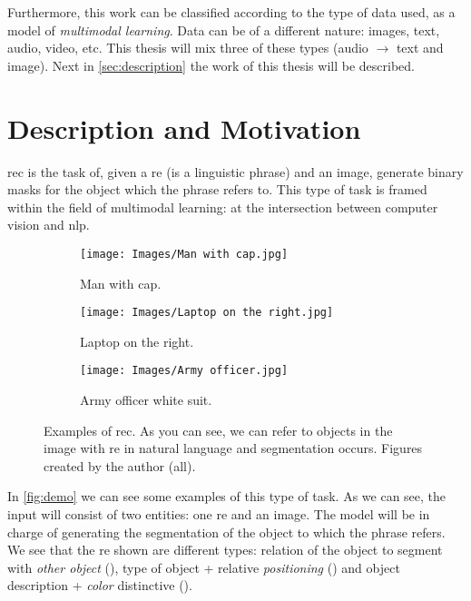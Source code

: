 Furthermore, this work can be classified according to the type of data used, as
a model of \emph{multimodal learning}. Data can be
of a different nature: images, text, audio, video, etc. This thesis will mix
three of these types (audio \(\rightarrow\) text and image). Next in
\vref{sec:description} the work of this thesis will be described.



\section{Description and Motivation}\label{sec:description}

\gls{rec} is the task of, given a \gls{re} (is a linguistic phrase) and an
image, generate binary masks for the object which the phrase refers to. This
type of task is framed within the field of multimodal learning: at the
intersection between computer vision and \gls{nlp}.

\begin{figure}[ht]
  \centering
  \begin{subfigure}[t]{.32\textwidth}
    \centering
    \caption{Man with cap.}
    \texttt{[image: Images/Man with cap.jpg]}
  \end{subfigure}\hfill
  \begin{subfigure}[t]{.32\textwidth}
    \centering
    \caption{Laptop on the right.}
    \texttt{[image: Images/Laptop on the right.jpg]}
  \end{subfigure}\hfill
  \begin{subfigure}[t]{.32\textwidth}
    \centering
    \caption{Army officer white suit.}
    \texttt{[image: Images/Army officer.jpg]}
  \end{subfigure}
  \caption[Examples of ]{Examples of \acl{rec}. As you can
    see, we can refer to objects in the image with \gls{re} in natural language
    and segmentation occurs. Figures created by the author
    (all).}\label{fig:demo}
\end{figure}

In \vref{fig:demo} we can see some examples of this type of task. As we can
see, the input will consist of two entities: one \gls{re} and an image. The
model will be in charge of generating the segmentation of the object to which
the phrase refers. We see that the \gls{re} shown are different types: relation
of the object to segment with \emph{other object} (), type
of object + relative \emph{positioning} () and object
description + \emph{color} distinctive ().

